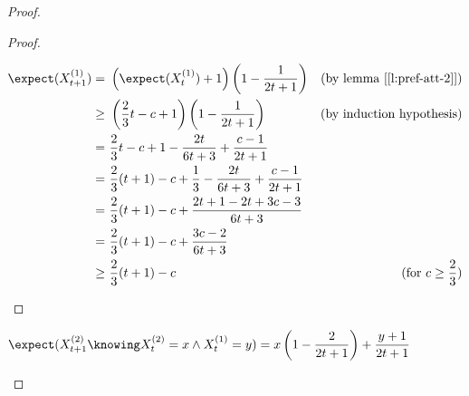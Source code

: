 \begin{proof}
\begin{proof}
\begin{itemize}
            \begin{align*}
                \expect(X_{t + 1}^{(1)}) =&\ \left( \expect(X_t^{(1)}) + 1 \right) \left( 1 - \frac{1}{2t + 1} \right)  & \text{(by lemma [\ref{l:pref-att-2}])}   \\
                \geq&\ \left( \frac{2}{3}t - c + 1 \right) \left( 1 - \frac{1}{2t + 1} \right)                          & \text{(by induction hypothesis)}         \\
                   =&\ \frac{2}{3}t - c + 1 - \frac{2t}{6t + 3} + \frac{c - 1}{2t + 1}                                  &                                       \\
                   =&\ \frac{2}{3}(t + 1) - c + \frac{1}{3} - \frac{2t}{6t + 3} + \frac{c - 1}{2t + 1}                  &                                       \\
                   =&\ \frac{2}{3}(t + 1) - c + \frac{2t + 1 - 2t + 3c - 3}{6t + 3}                                     &                                       \\
                   =&\ \frac{2}{3}(t + 1) - c + \frac{3c - 2}{6t + 3}                                                   &                                       \\
                \geq&\ \frac{2}{3}(t + 1) - c                                                                           &\text{(for $c \geq \frac{2}{3}$)}         \\
            \end{align*}
        \end{itemize}
    \end{proof}

    \vbox{}
    

    \vbox{}

    \begin{lem}\label{l:pref-att-4}
        $\displaystyle \expect(X_{t + 1}^{(2)} \knowing X_t^{(2)} = x \wedge X_t^{(1)} = y) = x \left( 1 - \frac{2}{2t + 1} \right) + \frac{y + 1}{2t + 1}$
    \end{lem}


\end{proof}
